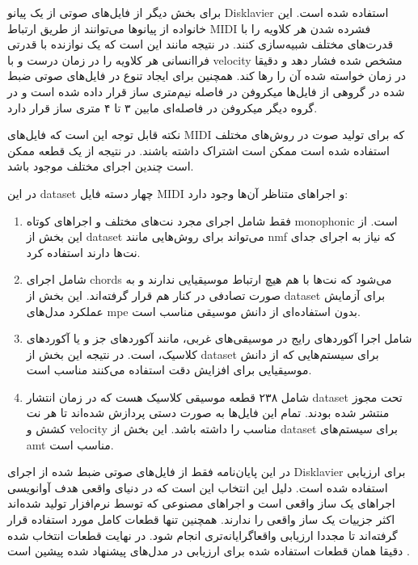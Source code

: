 برای بخش دیگر از فایل‌های صوتی از یک پیانو Disklavier استفاده شده است. این
خانواده از پیانوها می‌توانند از طریق ارتباط \gls{MIDI} فشرده شدن هر کلاویه را با
قدرت‌های مختلف شبیه‌سازی کنند. در نتیجه مانند این است که یک نوازنده با قدرتی
فراانسانی هر کلاویه را در زمان درست و با \gls{velocity} مشخص شده فشار دهد و
دقیقا در زمان خواسته شده آن را رها کند. همچنین برای ایجاد تنوع در فایل‌های صوتی
ضبط شده در گروهی از فایل‌ها میکروفن در فاصله نیم‌متری ساز قرار داده شده است و در
گروه دیگر میکروفن در فاصله‌ای مابین ۳ تا ۴ متری ساز قرار دارد.

نکته قابل توجه این است که فایل‌های \gls{MIDI} که برای تولید صوت در روش‌های مختلف
استفاده شده است ممکن است اشتراک داشته باشند. در نتیجه از یک قطعه ممکن است چندین
اجرای مختلف موجود باشد.

در این \gls{dataset} چهار دسته فایل \gls{MIDI} و اجراهای متناظر آن‌ها وجود دارد:
\begin{enumerate}
    \item فقط شامل اجرای مجرد نت‌های مختلف و اجراهای کوتاه
    \gls{monophonic} است. از این بخش از \gls{dataset} می‌تواند برای روش‌هایی
    مانند \gls{nmf} که نیاز به اجرای جدای نت‌ها دارند استفاده کرد.

    \item  شامل اجرای \glspl{chord} می‌شود که نت‌ها با هم هیچ ارتباط
    موسیقیایی ندارند و به صورت تصادفی در کنار هم قرار گرفته‌اند. این بخش از
    \gls{dataset} برای آزمایش عملکرد مدل‌های \gls{mpe} بدون استفاده‌ای از دانش
    موسیقی مناسب است.

    \item شامل اجرا آکوردهای رایج در موسیقی‌های غربی، مانند آکوردهای جز و یا
    آکوردهای کلاسیک، است. در نتیجه این بخش از \gls{dataset} برای سیستم‌هایی که
    از دانش موسیقیایی برای افزایش  دقت استفاده می‌کنند مناسب است.

    \item شامل ۲۳۸ قطعه موسیقی کلاسیک هست که در زمان انتشار \gls{dataset} تحت
    مجوز  منتشر شده بودند. تمام این فایل‌ها به صورت دستی
    پردازش شده‌اند تا هر نت کشش و \gls{velocity} مناسب را داشته باشد. این بخش از
    \gls{dataset} برای سیستم‌های \gls{amt} مناسب است.
\end{enumerate}

در این پایان‌نامه فقط از فایل‌های صوتی ضبط شده از اجرای Disklavier برای ارزیابی
استفاده شده است. دلیل این انتخاب این است که در دنیای واقعی هدف آوانویسی اجراهای
یک ساز واقعی است و اجراهای مصنوعی که توسط نرم‌افزار تولید شده‌اند اکثر جزییات یک
ساز واقعی را ندارند. همچنین تنها قطعات کامل مورد استفاده قرار گرفته‌اند تا مجددا
ارزیابی واقعاگرایانه‌تری انجام شود. در نهایت قطعات انتخاب شده دقیقا همان قطعات
استفاده شده برای ارزیابی در مدل‌های پیشنهاد شده پیشین است
\cite{hawthorne2017onsets,hawthorne2018enabling}.

